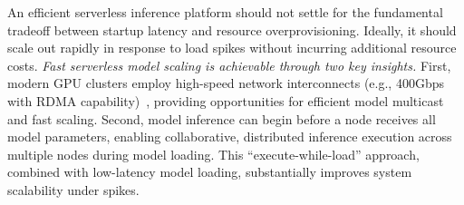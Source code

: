 An efficient serverless inference platform should not settle for the fundamental tradeoff between startup latency and resource overprovisioning. 
Ideally, it should scale out rapidly in response to load spikes without incurring additional resource costs. 
\emph{Fast serverless model scaling is achievable through two key insights.}
First, modern GPU clusters employ high-speed network interconnects (e.g., 400Gbps with RDMA capability)~\cite{acme_nsdi24, kundu_llm_analysis_arxiv24, azure_ai_cluster_url}, providing opportunities for efficient model multicast and fast scaling. 
Second, model inference can begin before a node receives all model parameters, enabling collaborative, distributed inference execution across multiple nodes during model loading. 
This ``execute-while-load'' approach, combined with low-latency model loading, substantially improves system scalability under spikes. 



